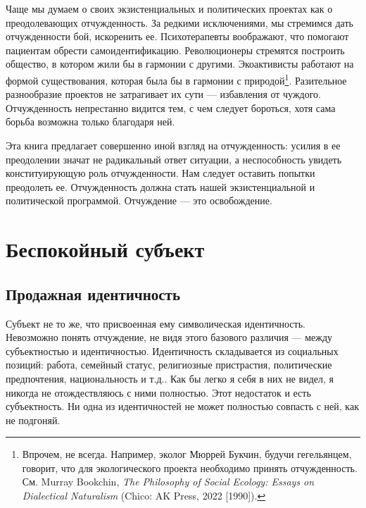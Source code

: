 \documentclass[12pt]{book}
\begin{document}
Чаще мы думаем о своих экзистенциальных и политических проектах как о преодолевающих отчужденность. За редкими исключениями, мы стремимся дать отчужденности бой, искоренить ее. Психотерапевты воображают, что помогают пациентам обрести самоидентификацию. Революционеры стремятся построить общество, в котором жили бы в гармонии с другими. Экоактивисты работают на формой существования, которая была бы в гармонии с природой\footnote{Впрочем, не всегда. Например, эколог Мюррей Букчин, будучи гегельянцем, говорит, что для экологического проекта необходимо принять отчужденность. См. Murray Bookchin, \textit{The Philosophy of Social Ecology: Essays on Dialectical Naturalism} (Chico: AK Press, 2022 [1990]).}. Разительное разнообразие проектов не затрагивает их сути --- избавления от чуждого. Отчужденность непрестанно видится тем, с чем следует бороться, хотя сама борьба возможна только благодаря ней.

Эта книга предлагает совершенно иной взгляд на отчужденность: усилия в ее преодолении значат не радикальный ответ ситуации, а неспособность увидеть конституирующую роль отчужденности. Нам следует оставить попытки преодолеть ее. Отчужденность должна стать нашей экзистенциальной и политической программой. Отчуждение --- это освобождение.

\chapter{Беспокойный субъект}

\section{Продажная идентичность}

Субъект не то же, что присвоенная ему символическая идентичность. Невозможно понять отчуждение, не видя этого базового различия --- между субъектностью и идентичностью. Идентичность складывается из социальных позиций: работа, семейный статус, религиозные пристрастия, политические предпочтения, национальность и т.д.. Как бы легко я себя в них не видел, я никогда не отождествляюсь с ними полностью. Этот недостаток и есть субъектность. Ни одна из идентичностей не может полностью совпасть с ней, как не подгоняй.
\end{document}
